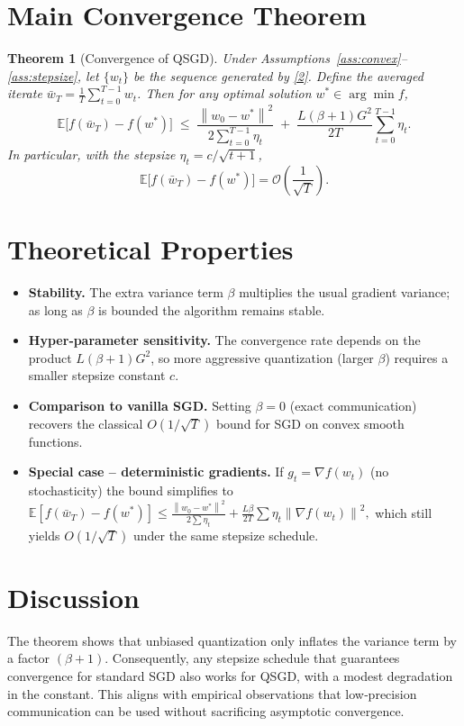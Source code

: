 \documentclass{article}
\newtheorem{theorem}{Theorem}
\newcommand{\E}{\mathbb{E}}
\newcommand{\norm}[1]{\left\lVert#1\right\rVert}
\begin{document}
\section*{Main Convergence Theorem}
\begin{theorem}[Convergence of QSGD]\label{thm:main}
Under Assumptions~\ref{ass:convex}–\ref{ass:stepsize}, let $\{w_{t}\}$ be the sequence generated by \eqref{2}.  
Define the averaged iterate $\bar w_{T}= \frac{1}{T}\sum_{t=0}^{T-1}w_{t}$.  
Then for any optimal solution $w^{*}\in\arg\min f$,
\[
\E\!\bigl[f(\bar w_{T})-f(w^{*})\bigr]
\;\le\;
\frac{\norm{w_{0}-w^{*}}^{2}}{2\sum_{t=0}^{T-1}\eta_{t}}
\;+\;
\frac{L(\beta+1)G^{2}}{2T}\sum_{t=0}^{T-1}\eta_{t}.
\]
In particular, with the stepsize $\eta_{t}=c/\sqrt{t+1}$,
\[
\E\!\bigl[f(\bar w_{T})-f(w^{*})\bigr]=
\mathcal{O}\!\left(\frac{1}{\sqrt{T}}\right).
\]
\end{theorem}

\section*{Theoretical Properties}
\begin{itemize}
\item \textbf{Stability.} The extra variance term $\beta$ multiplies the usual gradient variance; as long as $\beta$ is bounded the algorithm remains stable.
\item \textbf{Hyper‑parameter sensitivity.} The convergence rate depends on the product $L(\beta+1)G^{2}$, so more aggressive quantization (larger $\beta$) requires a smaller stepsize constant $c$.
\item \textbf{Comparison to vanilla SGD.} Setting $\beta=0$ (exact communication) recovers the classical $O(1/\sqrt{T})$ bound for SGD on convex smooth functions.
\item \textbf{Special case – deterministic gradients.} If $g_{t}=\nabla f(w_{t})$ (no stochasticity) the bound simplifies to 
\(
\E[f(\bar w_{T})-f(w^{*})]
\le \frac{\norm{w_{0}-w^{*}}^{2}}{2\sum\eta_{t}}
+ \frac{L\beta}{2T}\sum\eta_{t}\norm{\nabla f(w_{t})}^{2},
\)
which still yields $O(1/\sqrt{T})$ under the same stepsize schedule.
\end{itemize}

\section*{Discussion}
The theorem shows that unbiased quantization only inflates the variance term by a factor $(\beta+1)$. Consequently, any stepsize schedule that guarantees convergence for standard SGD also works for QSGD, with a modest degradation in the constant. This aligns with empirical observations that low‑precision communication can be used without sacrificing asymptotic convergence.
\end{document}
